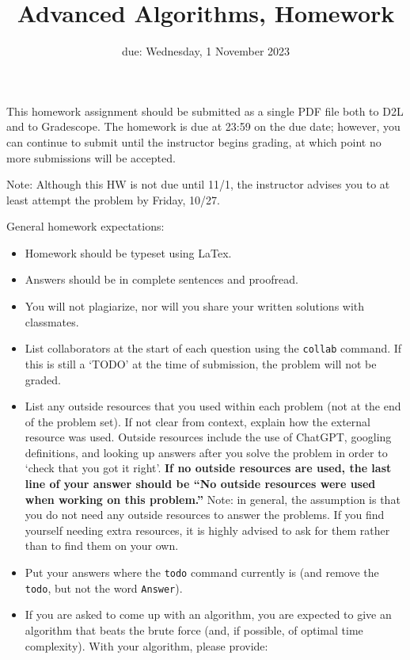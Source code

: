 \documentclass{article}
\title{Advanced Algorithms, Homework \hwnum}
\author{\todo{Your Name Here}}
\date{due: Wednesday, 1 November 2023}
\begin{document}
\maketitle

This homework assignment should be
submitted as a single PDF file both to D2L and to Gradescope.  The homework is
due at 23:59 on the due date; however, you can continue to submit until the
instructor begins grading, at which point no more submissions will be accepted.

Note: Although this HW is not due until 11/1, the instructor advises you to at
least attempt the problem by Friday, 10/27.

General homework expectations:
\begin{itemize}
    \item Homework should be typeset using LaTex.
    \item Answers should be in complete sentences and proofread.
    \item You will not plagiarize, nor will you share your written solutions
        with classmates.
    \item List collaborators at the start of each question using the
        \texttt{collab} command. If this is still a `TODO' at the time of
        submission, the problem will not
        be graded.
    \item List any outside resources that you used within each problem (not at
        the end of the problem set). If not clear from context, explain how the
        external resource was used.  Outside resources include the use of
        ChatGPT, googling definitions, and looking up answers after you solve
        the problem in order to `check that you got it right'.  {\bf If no outside resources are
        used, the last line of your answer should be ``No outside resources were
        used when working on this problem.''}  Note: in general, the assumption
        is that you do not need any outside resources to answer the problems.
        If you find yourself needing extra resources, it is highly advised to
        ask for them rather than to find them on your own.
    \item Put your answers where the \texttt{todo} command currently is (and
        remove the \texttt{todo}, but not the word \texttt{Answer}).
    \item If you are asked to come up with an algorithm, you are
        expected to give an algorithm that beats the brute force (and, if possible, of
        optimal time complexity). With your algorithm, please provide:

\end{itemize}
\end{document}
